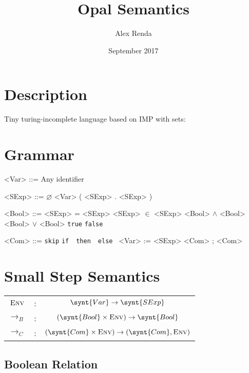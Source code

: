 \documentclass{article}
\title{Opal Semantics}
\author{Alex Renda}
\date{September 2017}
\newcommand{\ifstmt}[3]{\texttt{if}\ #1\ \texttt{then}\ #2\ \texttt{else}\ #3}
\newcommand{\true}{\texttt{true}}
\newcommand{\false}{\texttt{false}}
\newcommand{\skipcom}{\texttt{skip}}
\newcommand{\onestep}[1]{\rightarrow_{#1}}
\newcommand{\com}{C}
\newcommand{\bool}{B}
\begin{document}
\maketitle

\section{Description}

Tiny turing-incomplete language based on IMP with sets:

\section{Grammar}

\begin{grammar}
<Var> ::= Any identifier

<SExp> ::= $\varnothing$
\alt <Var>
\alt ( <SExp> . <SExp> )

<Bool> ::= <SExp> = <SExp>
\alt <SExp> $\in$ <SExp>
\alt <Bool> $\land$ <Bool>
\alt <Bool> $\lor$ <Bool>
\alt \true
\alt \false

<Com> ::= \skipcom
\alt \ifstmt{}{}{}
\alt <Var> := <SExp>
\alt <Com> ; <Com>

\end{grammar}

\section{Small Step Semantics}
\begin{center}
\begin{tabular}{c c c}
$\textsc{Env}$  & :  & $\synt{Var} \rightarrow \synt{SExp}$ \\
$\onestep\bool$  & :  & $(\synt{Bool} \times \textsc{Env}) \rightarrow \synt{Bool}$ \\
$\onestep\com$  & :  & $(\synt{Com} \times \textsc{Env}) \rightarrow (\synt{Com}, \textsc{Env})$ \\
\end{tabular}
\end{center}

\subsection{Boolean Relation}

\end{document}
